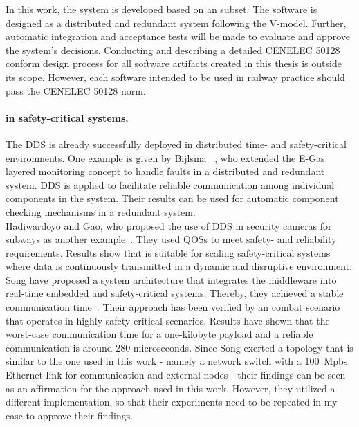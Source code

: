 In this work, the system is developed based on an  subset.
The software is designed as a distributed and redundant system following the V-model.
Further, automatic integration and acceptance tests will be made to evaluate and approve the system's decisions.
Conducting and describing a detailed CENELEC 50128 conform design process for all software artifacts created in this thesis is outside its scope.
However, each software intended to be used in railway practice should pass the CENELEC 50128 norm.

\paragraph{ in safety-critical systems.}
The \gls*{DDS} is already successfully deployed in distributed time- and safety-critical environments.
One example is given by Bijlsma \etal~\cite{DistributedSafety2020}, who extended the E-Gas layered monitoring concept to handle faults in a distributed and redundant system.
\Gls*{DDS} is applied to facilitate reliable communication among individual components in the system.
Their results can be used for automatic component checking mechanisms in a redundant system.
\\

Hadiwardoyo and Gao, who proposed the use of \gls*{DDS} in security cameras for subways as another example~\cite{DDSInSubways}.
They used \glspl*{QOS} to meet safety- and reliability requirements.
Results show that  is suitable for scaling safety-critical systems where data is continuously transmitted in a dynamic and disruptive environment.
\\

Song \etal have proposed a system architecture that integrates the  middleware into real-time embedded and safety-critical systems.
Thereby, they achieved a stable communication time~\cite{SongDDSInRealTimeSystems}.
Their approach has been verified by an  combat scenario that operates in highly safety-critical scenarios.
Results have shown that the worst-case communication time for a one-kilobyte payload and a reliable communication  is around 280 microseconds.
Since Song \etal exerted a topology that is similar to the one used in this work - namely a network switch with a 100~Mpbs Ethernet link for communication and external nodes - their findings can be seen as an affirmation for the approach used in this work.
However, they utilized a different  implementation, so that their experiments need to be repeated in my case to approve their findings. 
\\

